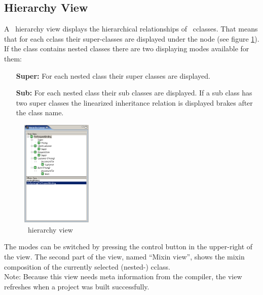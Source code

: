 \subsection{Hierarchy View\label{hierarchyview}}
A \caesarj ~hierarchy view displays the hierarchical relationships of \caesarj ~cclasses. That means that for each cclass their super-classes are displayed under the  node (see figure \ref{fig:hierarchy_view}). If the class contains nested classes there are two displaying modes available for them:
\begin{itemize}
	\item[\textbf{Super:}] For each nested class their super classes are displayed.
	\item[\textbf{Sub:}] For each nested class their sub classes are displayed. If a sub class has two super classes the linearized inheritance relation is displayed brakes after the class name.
\end{itemize}

\begin{figure}[htbp]
	\centering
		\includegraphics[width=0.30\textwidth]{images/hierarchy.png}
	\caption{\caesarj ~hierarchy view}
	\label{fig:hierarchy_view}
\end{figure}

The modes can be switched by pressing the control button in the upper-right of the view. The second part of the view, named "`Mixin view"', shows the mixin composition of the currently selected (nested-) cclass.\\
Note: Because this view needs meta information from the compiler, the view refreshes when a project was built successfully.

